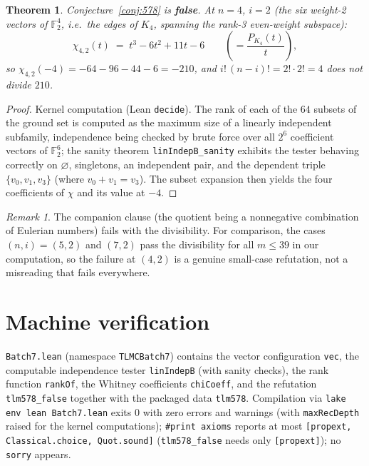 \documentclass[11pt]{article}
\newtheorem{theorem}{Theorem}[section]
\theoremstyle{definition}
\theoremstyle{remark}
\newtheorem*{remark}{Remark}
\begin{document}
\begin{theorem}\label{thm:578}
Conjecture~\ref{conj:578} is \textbf{false}. At $n = 4$, $i = 2$ (the six weight-2 vectors of $\mathbb{F}_2^4$, i.e.\ the edges of $K_4$, spanning the rank-3 even-weight subspace):
\[
\chi_{4,2}(t) \;=\; t^3 - 6t^2 + 11t - 6 \qquad\left(= \frac{P_{K_4}(t)}{t}\right),
\]
so $\chi_{4,2}(-4) = -64 - 96 - 44 - 6 = -210$, and $i!\,(n-i)! = 2!\cdot 2! = 4$ does not divide $210$.
\end{theorem}

\begin{proof}
Kernel computation (Lean \texttt{decide}). The rank of each of the $64$ subsets of the ground set is computed as the maximum size of a linearly independent subfamily, independence being checked by brute force over all $2^6$ coefficient vectors of $\mathbb{F}_2^6$; the sanity theorem \texttt{linIndepB\_sanity} exhibits the tester behaving correctly on $\varnothing$, singletons, an independent pair, and the dependent triple $\{v_0, v_1, v_3\}$ (where $v_0 + v_1 = v_3$). The subset expansion then yields the four coefficients of $\chi$ and its value at $-4$.
\end{proof}

\begin{remark}
The companion clause (the quotient being a nonnegative combination of Eulerian numbers) fails with the divisibility. For comparison, the cases $(n,i) = (5,2)$ and $(7,2)$ pass the divisibility for all $m \le 39$ in our computation, so the failure at $(4,2)$ is a genuine small-case refutation, not a misreading that fails everywhere.
\end{remark}

\section{Machine verification}

\texttt{Batch7.lean} (namespace \texttt{TLMCBatch7}) contains the vector configuration \texttt{vec}, the computable independence tester \texttt{linIndepB} (with sanity checks), the rank function \texttt{rankOf}, the Whitney coefficients \texttt{chiCoeff}, and the refutation \texttt{tlm578\_false} together with the packaged data \texttt{tlm578}. Compilation via \texttt{lake env lean Batch7.lean} exits $0$ with zero errors and warnings (with \texttt{maxRecDepth} raised for the kernel computations); \texttt{\#print axioms} reports at most \texttt{[propext, Classical.choice, Quot.sound]} (\texttt{tlm578\_false} needs only \texttt{[propext]}); no \texttt{sorry} appears.
\end{document}

